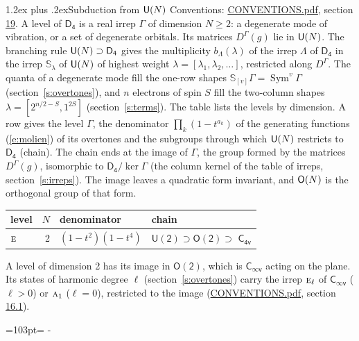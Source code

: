 \documentclass[10pt,a4paper]{article}
\makeatletter
\renewcommand\section{\@startsection{section}{1}{\z@}{-3ex plus -1ex minus -.2ex}%
  {1.2ex plus .2ex}{\normalfont\large\sffamily\bfseries\color{parttitle}}}
\newcommand{\needspace}[1]{\par\penalty-100\begingroup\dimen0=#1\relax\dimen2=\pagegoal
  \advance\dimen2-\pagetotal\ifdim\dimen0>\dimen2\relax\ifdim\dimen2>0pt\vfil\break\fi\fi
  \endgroup}
\numberwithin{equation}{section}
\newcommand{\grp}[1]{\mathsf{#1}}
\newcommand{\irr}[1]{\text{\normalfont\scshape #1}}
\newcommand{\repD}[1]{D^{#1}}
\newcommand{\schur}[1]{\mathbb{S}_{#1}}
\newcommand{\shape}[1]{[#1]}
\makeatother
\begin{document}
\section{Subduction from \texorpdfstring{$\grp{U(\mathnormal{N})}$}{U(N)}}\label{s:unitary}
Conventions: \href{../../CONVENTIONS.pdf}{CONVENTIONS.pdf}, section \href{../../CONVENTIONS.pdf\#conv.19}{19}.
\leavevmode\label{n:local.level.dimension}A level of $\grp{D_{4}}$ is a real irrep $\Gamma$ of dimension $N \ge 2$: a degenerate mode of vibration, or a set of degenerate orbitals. \label{n:group.unitary}Its matrices $\repD{\Gamma}(g)$ lie in $\grp{U(\mathnormal{N})}$. \label{n:irrep.schur}\label{n:shape.partition}\label{n:local.partition}\label{n:function.multiplicity.unitary}The branching rule $\grp{U(\mathnormal{N})} \supset \grp{D_{4}}$ gives the multiplicity $b_\Lambda(\lambda)$ of the irrep $\Lambda$ of $\grp{D_{4}}$ in the irrep $\schur{\lambda}$ of $\grp{U(\mathnormal{N})}$ of highest weight $\lambda = \shape{\lambda_1, \lambda_2, \dots}$, restricted along $\repD{\Gamma}$. \label{n:local.partition.power}\label{n:local.electrons}\label{n:local.spin}The quanta of a degenerate mode fill the one-row shapes $\schur{\shape{v}}\Gamma = \operatorname{Sym}^{v}\Gamma$ (section~\ref{s:overtones}), and $n$ electrons of spin $S$ fill the two-column shapes $\lambda = \shape{2^{n/2-S}, 1^{2S}}$ (section~\ref{s:terms}).
The table lists the levels by dimension. \label{n:head.level}\label{n:head.denominator}\label{n:index.overtone.denominator}\label{n:head.chain}A row gives the level $\Gamma$, the denominator $\prod_k (1 - t^{a_k})$ of the generating functions (\ref{e:molien}) of its overtones and the subgroups through which $\grp{U(\mathnormal{N})}$ restricts to $\grp{D_{4}}$ (chain). The chain ends at the image of $\Gamma$, the group formed by the matrices $\repD{\Gamma}(g)$, isomorphic to $\grp{D_{4}}/\ker\Gamma$ (the column kernel of the table of irreps, section~\ref{s:irreps}). The image leaves a quadratic form invariant, and $\grp{O(\mathnormal{N})}$ is the orthogonal group of that form.
{\small\begin{longtable}{@{}lrll@{}}\toprule
level & $N$ & denominator & chain\\\midrule\endhead
\bottomrule\endfoot\endlastfoot
$\irr{e}$ & 2 & $(1-t^{2})(1-t^{4})$ & $\grp{U(2)} \supset \grp{O(2)} \supset$ \href{C4v.pdf}{$\grp{C_{4v}}$}\\
\bottomrule\end{longtable}}
A level of dimension 2 has its image in $\grp{O(2)}$, which is \href{Cinfv.pdf}{$\grp{C_{\infty v}}$} acting on the plane. \label{n:index.harmonic.degree}Its states of harmonic degree $\ell$ (section~\ref{s:overtones}) carry the irrep $\irr{e}_{\ell}$ of \href{Cinfv.pdf}{$\grp{C_{\infty v}}$} ($\ell > 0$) or $\irr{a}_{1}$ ($\ell = 0$), restricted to the image (\href{../../CONVENTIONS.pdf}{CONVENTIONS.pdf}, section \href{../../CONVENTIONS.pdf\#conv.16.1}{16.1}).
\needspace{103pt}
\end{document}
